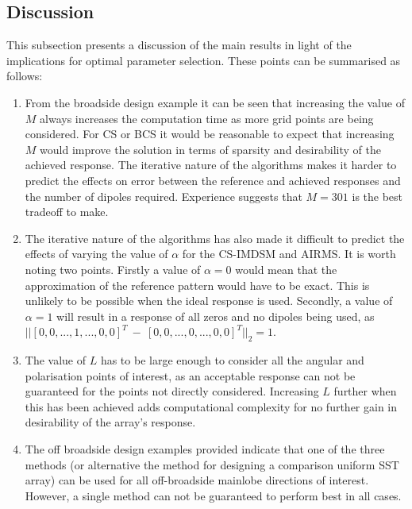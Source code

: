 \documentclass[10pt,final]{IEEEtran}
\begin{document}
\subsection{Discussion}
This subsection presents a discussion of the main results in light of the implications for optimal parameter selection.  These points can be summarised as follows:
\begin{enumerate}
  \item From the broadside design example it can be seen that increasing the value of $M$ always increases
  the computation time as more grid points are being considered.  For CS or BCS it would be reasonable to
  expect that increasing $M$ would improve the solution in terms of sparsity and desirability of the achieved
  response.  The iterative nature of the algorithms makes it harder to predict the effects on error
  between the reference and achieved responses and the number of dipoles required.  Experience suggests that
  $M=301$ is the best tradeoff to make.
  \item The iterative nature of the algorithms has also made it difficult to predict the effects of varying
  the value of $\alpha$ for the CS-IMDSM and AIRMS.  It is worth noting two points.  Firstly a
  value of $\alpha=0$ would mean that the approximation of the reference pattern would have to be exact.
  This is unlikely to be possible when the ideal response is used.  Secondly, a value of $\alpha=1$ will
  result in a response of all zeros and no dipoles being used, as $||[0, 0, ..., 1, ..., 0, 0]^{T}~-~[0, 0, ..., 0, ..., 0, 0]^{T}||_{2}=1$.
  \item The value of $L$ has to be large enough to consider all the angular and polarisation points of
  interest, as an acceptable response can not be guaranteed for the points not directly considered.
  Increasing $L$ further when this has been achieved adds computational complexity for no further
  gain in desirability of the array's response.
  \item The off broadside design examples provided indicate that one of the three methods (or alternative the method for designing a comparison uniform SST array) can be used for all off-broadside mainlobe directions of interest.  However, a single method can not be guaranteed to perform best in all cases.
\end{enumerate}
\end{document}
